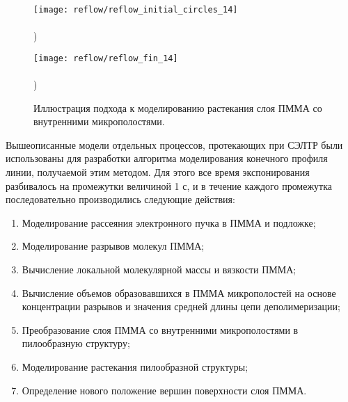 \begin{figure}[h]
	\begin{minipage}{0.48\textwidth}
		\texttt{[image: reflow/reflow\_initial\_circles\_14]} \\
		\vspace{-28.5ex} \\ ) \\ \vspace{28.5ex}
	\end{minipage}
	\begin{minipage}{0.48\textwidth}
		\texttt{[image: reflow/reflow\_fin\_14]} \\
		\vspace{-28.5ex} \\ ) \\ \vspace{28.5ex}
	\end{minipage}
	\vspace{-3.5em}
	\caption{Иллюстрация подхода к моделированию растекания слоя ПММА со внутренними микрополостями.}
	\label{fig:reflow_surface}
\end{figure}

Вышеописанные модели отдельных процессов, протекающих при СЭЛТР были использованы для разработки алгоритма моделирования конечного профиля линии, получаемой этим методом. Для этого все время экспонирования разбивалось на промежутки величиной 1 с, и в течение каждого промежутка последовательно производились следующие действия:
\begin{enumerate}
	\item Моделирование рассеяния электронного пучка в ПММА и подложке;
	\item Моделирование разрывов молекул ПММА;
	\item Вычисление локальной молекулярной массы и вязкости ПММА;
	\item Вычисление объемов образовавшихся в ПММА микрополостей на основе концентрации разрывов и значения средней длины цепи деполимеризации;
	\item Преобразование слоя ПММА со внутренними микрополостями в пилообразную структуру;
	\item Моделирование растекания пилообразной структуры;
	\item Определение нового положение вершин поверхности слоя ПММА.
\end{enumerate}

